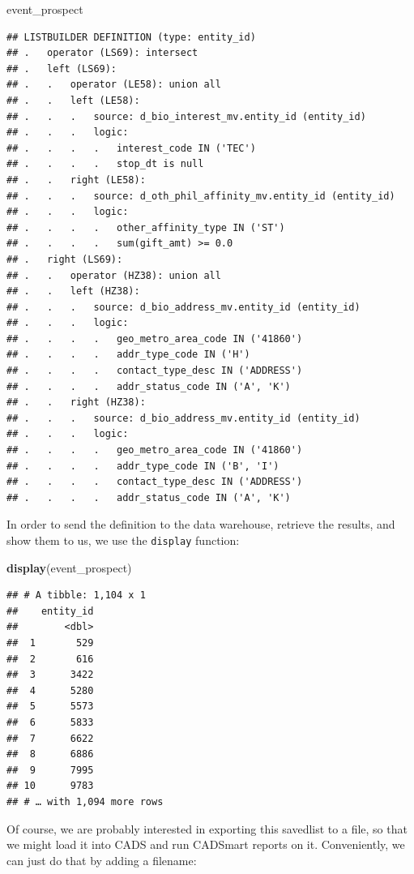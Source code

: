 \documentclass[]{book}
\newenvironment{Shaded}{\begin{snugshade}}{\end{snugshade}}
\newcommand{\KeywordTok}[1]{\textcolor[rgb]{0.13,0.29,0.53}{\textbf{#1}}}
\newcommand{\NormalTok}[1]{#1}
\begin{document}
\begin{Shaded}
\begin{Highlighting}[]
\NormalTok{event_prospect}
\end{Highlighting}
\end{Shaded}

\begin{verbatim}
## LISTBUILDER DEFINITION (type: entity_id)
## .   operator (LS69): intersect
## .   left (LS69): 
## .   .   operator (LE58): union all
## .   .   left (LE58): 
## .   .   .   source: d_bio_interest_mv.entity_id (entity_id)
## .   .   .   logic: 
## .   .   .   .   interest_code IN ('TEC')
## .   .   .   .   stop_dt is null
## .   .   right (LE58): 
## .   .   .   source: d_oth_phil_affinity_mv.entity_id (entity_id)
## .   .   .   logic: 
## .   .   .   .   other_affinity_type IN ('ST')
## .   .   .   .   sum(gift_amt) >= 0.0
## .   right (LS69): 
## .   .   operator (HZ38): union all
## .   .   left (HZ38): 
## .   .   .   source: d_bio_address_mv.entity_id (entity_id)
## .   .   .   logic: 
## .   .   .   .   geo_metro_area_code IN ('41860')
## .   .   .   .   addr_type_code IN ('H')
## .   .   .   .   contact_type_desc IN ('ADDRESS')
## .   .   .   .   addr_status_code IN ('A', 'K')
## .   .   right (HZ38): 
## .   .   .   source: d_bio_address_mv.entity_id (entity_id)
## .   .   .   logic: 
## .   .   .   .   geo_metro_area_code IN ('41860')
## .   .   .   .   addr_type_code IN ('B', 'I')
## .   .   .   .   contact_type_desc IN ('ADDRESS')
## .   .   .   .   addr_status_code IN ('A', 'K')
\end{verbatim}

In order to send the definition to the data warehouse, retrieve the results, and show them to us, we use the \texttt{display} function:

\begin{Shaded}
\begin{Highlighting}[]
\KeywordTok{display}\NormalTok{(event_prospect)}
\end{Highlighting}
\end{Shaded}

\begin{verbatim}
## # A tibble: 1,104 x 1
##    entity_id
##        <dbl>
##  1       529
##  2       616
##  3      3422
##  4      5280
##  5      5573
##  6      5833
##  7      6622
##  8      6886
##  9      7995
## 10      9783
## # … with 1,094 more rows
\end{verbatim}

Of course, we are probably interested in exporting this savedlist to a file, so that we might load it into CADS and run CADSmart reports on it. Conveniently, we can just do that by adding a filename:
\end{document}
